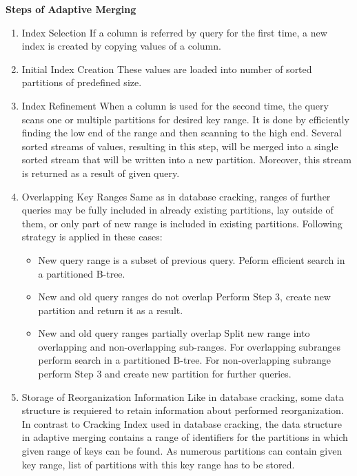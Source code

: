 \documentclass[10pt, conference, compsocconf]{IEEEtran}
\begin{document}
\textbf{Steps of Adaptive Merging} 
\begin{enumerate}
\item{Index Selection}
If a column is referred by query for the first time, a new index is created by copying values of a column. \\
\item{Initial Index Creation}
These values are loaded into number of sorted partitions of predefined size. \\
\item{Index Refinement}
When a column is used for the second time, the query scans one or multiple partitions for desired key range. It is done by efficiently finding the low end of the range and then scanning to the high end. Several sorted streams of values, resulting in this step, will be merged into a single sorted stream that will be written into a new partition. Moreover, this stream is returned as a result of given query.\\
\item{Overlapping Key Ranges}
Same as in database cracking, ranges of further queries may be fully included in already existing partitions, lay outside of them, or only part of new range is included in existing partitions. Following strategy is applied in these cases:
\begin{itemize}
\item{New query range is a subset of previous query.}
Peform efficient search in a partitioned B-tree.\\
\item{New and old query ranges do not overlap}
Perform Step 3, create new partition and return it as a result.\\
\item{New and old query ranges partially overlap}
Split new range into overlapping and non-overlapping sub-ranges. For overlapping subranges perform search in a partitioned B-tree. For non-overlapping subrange perform Step 3 and create new partition for further queries.\\
\end{itemize}
\item{Storage of Reorganization Information}
Like in database cracking, some data structure is requiered to retain information about performed reorganization. In contrast to Cracking Index used in database cracking, the data structure in adaptive merging contains a range of identifiers for the partitions in which given range of keys can be found. As numerous partitions can contain given key range, list of partitions with this key range has to be stored.
\end{enumerate}
\end{document}
